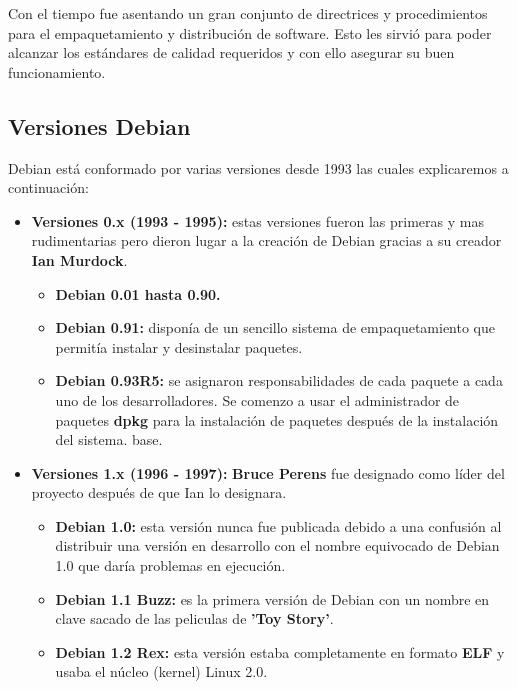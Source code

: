 \documentclass[a4paper, 12pt]{book}
\begin{document}
Con el tiempo fue asentando un gran conjunto de directrices y procedimientos para el empaquetamiento y distribución de software. Esto les sirvió para poder alcanzar los estándares de calidad requeridos y con ello asegurar su buen funcionamiento.

\subsection{Versiones Debian}
\label{subsec:versiones debian}

Debian está conformado por varias versiones desde 1993 las cuales explicaremos a continuación:

\begin{itemize}

	\item \textbf {Versiones 0.x (1993 - 1995):} estas versiones fueron las primeras y mas rudimentarias pero dieron lugar a la creación de Debian gracias a su creador \textbf {Ian Murdock}.
	\begin{itemize}
		\item \textbf {Debian 0.01 hasta 0.90.}
		\item \textbf {Debian 0.91:} disponía de un sencillo sistema de empaquetamiento que permitía instalar y desinstalar paquetes.
		\item \textbf {Debian 0.93R5:}  se asignaron responsabilidades de cada paquete a cada uno de los desarrolladores. Se comenzo a usar el administrador de paquetes \textbf {dpkg} para la instalación de paquetes después de la instalación del sistema.
		base.
	\end{itemize}
	\item \textbf {Versiones 1.x (1996 - 1997):} \textbf{Bruce Perens} fue designado como líder del proyecto después de que Ian lo designara.
	\begin{itemize}
		\item \textbf {Debian 1.0:} esta versión nunca fue publicada debido a una confusión al distribuir una versión en desarrollo con el nombre equivocado de Debian 1.0 que daría problemas en ejecución.
		\item \textbf {Debian 1.1 Buzz: } es la primera versión de Debian con un nombre en clave sacado de las peliculas de \textbf {'Toy Story'}.
		\item \textbf {Debian 1.2 Rex: } esta versión estaba completamente en formato \textbf{ELF} y usaba el núcleo (kernel) Linux 2.0.
		

\end{itemize}
\end{itemize}
\end{document}
